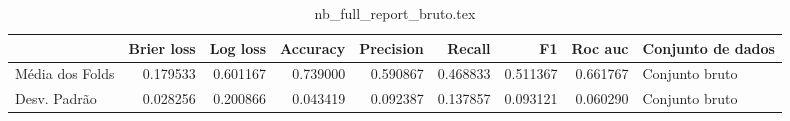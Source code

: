\begin{table}
\centering
\caption{nb_full_report_bruto.tex}
\label{nb_full_report_bruto.tex}
\begin{tabular}{lrrrrrrrl}
\toprule
{}               &  Brier  loss &  Log loss &  Accuracy  &  Precision  &   Recall  &       F1  &  Roc auc  & Conjunto de dados \\
\midrule
Média dos Folds &     0.179533 &  0.601167 &   0.739000 &    0.590867 &  0.468833 &  0.511367 &  0.661767 &    Conjunto bruto \\
Desv. Padrão    &     0.028256 &  0.200866 &   0.043419 &    0.092387 &  0.137857 &  0.093121 &  0.060290 &    Conjunto bruto \\
\bottomrule
\end{tabular}
\end{table}

